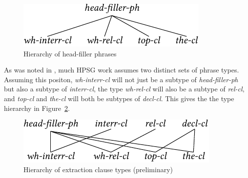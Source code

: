 \documentclass[output=paper
                ,modfonts
                ,nonflat
	        ,collection
	        ,collectionchapter
	        ,collectiontoclongg
 	        ,biblatex
                ,babelshorthands
                ,newtxmath
                ,draftmode
                ,colorlinks, citecolor=brown
]{./langsci/langscibook}
\begin{document}
{\begin{figure}[htb]
  \includegraphics{figures/BB-head-fill-hier-crop}
  \caption{\label{fig:UDC:48}Hierarchy of head-filler phrases}
  
\end{figure}


As was noted in , much HPSG work assumes two distinct sets of
phrase types. Assuming this positon, \emph{wh-interr-cl} will not just
be a subtype of \emph{head-filler-ph} but also a subtype of
\emph{interr-cl}, the type \emph{wh-rel-cl} will also be a subtype of
\emph{rel-cl}, and \emph{top-cl} and \emph{the-cl} will both be subtypes
of \emph{decl-cl}. This gives the the type hierarchy in Figure~\ref{fig:UDC:49}.

\begin{figure}[htb]
  \centering

  \includegraphics{figures/BB-extraction-function-hier-crop}
  \caption{\label{fig:UDC:49}Hierarchy of extraction clause types (preliminary)}
  
\end{figure}


}
\end{document}

